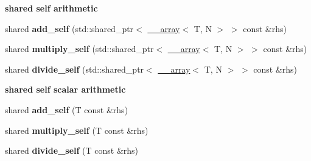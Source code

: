 \begin{Indent}{\bf shared self arithmetic}\par
{\em \label{_amgrp0ebedd0318bf343b5e17c1deddd1521f}
 }\begin{DoxyCompactItemize}
\item 
\hypertarget{class____array_ab98796270b9e65a78d5d9eda70c66ef9}{
shared {\bfseries add\_\-self} (std::shared\_\-ptr$<$ \hyperlink{class____array}{\_\-\_\-array}$<$ T, N $>$ $>$ const \&rhs)}
\label{class____array_ab98796270b9e65a78d5d9eda70c66ef9}

\item 
\hypertarget{class____array_a34920f8760f31932fa0b7134ad852fe3}{
shared {\bfseries multiply\_\-self} (std::shared\_\-ptr$<$ \hyperlink{class____array}{\_\-\_\-array}$<$ T, N $>$ $>$ const \&rhs)}
\label{class____array_a34920f8760f31932fa0b7134ad852fe3}

\item 
\hypertarget{class____array_a99892174a079f472bcd3f95621e5b18e}{
shared {\bfseries divide\_\-self} (std::shared\_\-ptr$<$ \hyperlink{class____array}{\_\-\_\-array}$<$ T, N $>$ $>$ const \&rhs)}
\label{class____array_a99892174a079f472bcd3f95621e5b18e}

\end{DoxyCompactItemize}
\end{Indent}
\begin{Indent}{\bf shared self scalar arithmetic}\par
{\em \label{_amgrp39886a4931184ad2091cad99cafe00de}
 }\begin{DoxyCompactItemize}
\item 
\hypertarget{class____array_a6ac3f286d87cf856e47b5e3cd4bceaf5}{
shared {\bfseries add\_\-self} (T const \&rhs)}
\label{class____array_a6ac3f286d87cf856e47b5e3cd4bceaf5}

\item 
\hypertarget{class____array_a87ee1d56dc650d1cc15fc4a17e29a2ff}{
shared {\bfseries multiply\_\-self} (T const \&rhs)}
\label{class____array_a87ee1d56dc650d1cc15fc4a17e29a2ff}

\item 
\hypertarget{class____array_a082fa2c88f43930d0138e9ccd383e59b}{
shared {\bfseries divide\_\-self} (T const \&rhs)}
\label{class____array_a082fa2c88f43930d0138e9ccd383e59b}

\end{DoxyCompactItemize}
\end{Indent}
